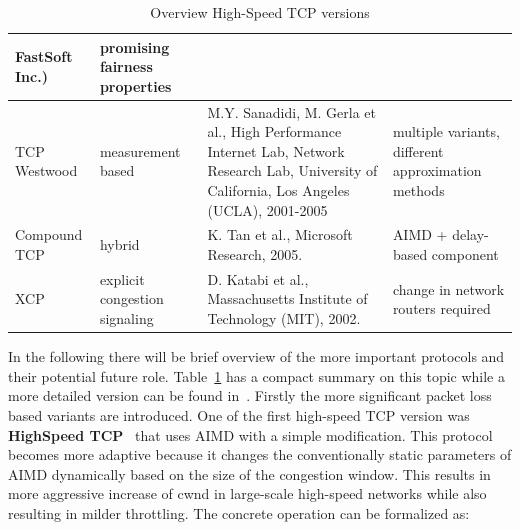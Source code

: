 \documentclass[a4paper]{article}
\begin{document}
\begin{table}
\begin{tabular}{|p{}|p{}|p{}|p{}|}
        FastSoft Inc.)                                                                & promising fairness properties                                                                                                         \\\hline
        \cellcolor{blue!25}TCP Westwood                                               & measurement based                      & M.Y. Sanadidi, M. Gerla et al., High Performance Internet Lab,
        Network Research Lab, University of California, Los Angeles (UCLA), 2001-2005 & multiple variants, different
        approximation methods                                                                                                                                                                                                 \\\hline
        \cellcolor{blue!25}Compound TCP                                               & hybrid                                 & K. Tan et al., Microsoft Research, 2005.                               & AIMD + delay-based
        component                                                                                                                                                                                                             \\\hline
        \cellcolor{blue!25}XCP                                                        & explicit congestion signaling          & D. Katabi et al., Massachusetts Institute of Technology (MIT),
        2002.                                                                         & change in network routers required                                                                                                    \\\hline
    \end{tabular}
    \caption{Overview High-Speed TCP versions}
    \label{table:tcpver}
\end{table}

In the following there will be brief overview of the more important protocols and their potential future role.
Table~\ref{table:tcpver} has a compact summary on this topic while a more detailed version can be found
in~\cite{TCPFairnessAnalysis}. Firstly the more significant packet loss based variants are introduced. One of the first
high-speed TCP version was \textbf{HighSpeed TCP}~\cite{HighSpeedTCP} that uses AIMD with a simple modification. This
protocol becomes more adaptive because it changes the conventionally static parameters of AIMD dynamically based on the
size of the congestion window. This results in more aggressive increase of cwnd in large-scale high-speed networks
while also resulting in milder throttling. The concrete operation can be formalized as:
\end{document}
